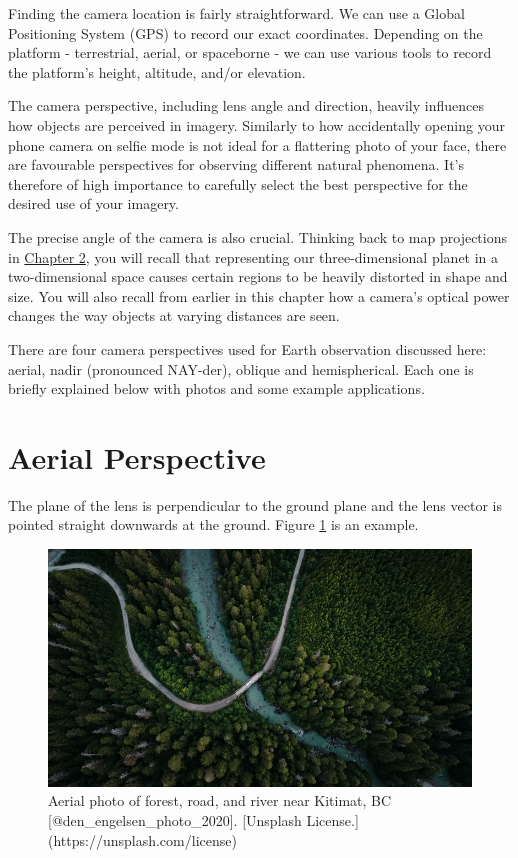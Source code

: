 \documentclass[
]{book}
\begin{document}
Finding the camera location is fairly straightforward. We can use a Global Positioning System (GPS) to record our exact coordinates. Depending on the platform - terrestrial, aerial, or spaceborne - we can use various tools to record the platform's height, altitude, and/or elevation.

The camera perspective, including lens angle and direction, heavily influences how objects are perceived in imagery. Similarly to how accidentally opening your phone camera on selfie mode is not ideal for a flattering photo of your face, there are favourable perspectives for observing different natural phenomena. It's therefore of high importance to carefully select the best perspective for the desired use of your imagery.

The precise angle of the camera is also crucial. Thinking back to map projections in \href{https://ubc-geomatics-textbook.github.io/geomatics-textbook/mapping-data.html}{Chapter 2}, you will recall that representing our three-dimensional planet in a two-dimensional space causes certain regions to be heavily distorted in shape and size. You will also recall from earlier in this chapter how a camera's optical power changes the way objects at varying distances are seen.

There are four camera perspectives used for Earth observation discussed here: aerial, nadir (pronounced NAY-der), oblique and hemispherical. Each one is briefly explained below with photos and some example applications.

\hypertarget{aerial-perspective}{%
\section{Aerial Perspective}\label{aerial-perspective}}

The plane of the lens is perpendicular to the ground plane and the lens vector is pointed straight downwards at the ground. Figure \ref{fig:12-aerial-plane} is an example.

\begin{figure}
\includegraphics[width=0.9\linewidth]{images/12-aerial-plane} \caption{Aerial photo of forest, road, and river near Kitimat, BC [@den_engelsen_photo_2020]. [Unsplash License.](https://unsplash.com/license)}\label{fig:12-aerial-plane}
\end{figure}
\end{document}
